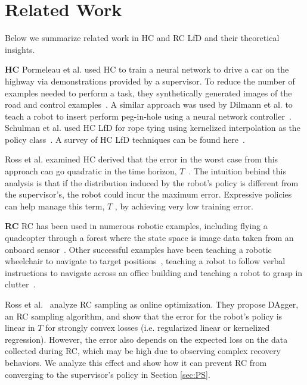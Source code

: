 \documentclass[10pt, conference]{ieeeconf}      %
\newcommand{\ns}{HC }
\newcommand{\nc}{RC }
\begin{document}
\section{Related Work}
Below we summarize related work in HC and RC LfD and their theoretical insights. 

\noindent \textbf {\ns}  Pormeleau et al. used \ns to train a neural network to drive a car on the highway via demonstrations provided by a supervisor. To reduce the number of examples needed to perform a task, they synthetically generated images of the road and control examples~\cite{pomerleau1989alvinn}.  A similar approach was used by Dilmann et al. to teach a robot to insert perform peg-in-hole using a neural network controller~\cite{dillmann1995acquisition}. Schulman et al. used HC LfD for rope tying using kernelized interpolation as the policy class~\cite{schulman2016learning}.  A survey of HC LfD techniques can be found here~\cite{argall2009survey}. 

Ross et al. examined \ns  derived that the error in the worst case from this approach can go quadratic in the time horizon, $T$~\cite{ross2010efficient}. The intuition behind this analysis is that if the distribution induced by the robot's policy is different from the supervisor's, the robot could incur the maximum error. Expressive policies can help manage this term, $T$ , by achieving very low training error. 

\noindent \textbf{\nc}
\nc has been used in numerous robotic examples, including flying a quadcopter through a forest where the state space is image data taken from an onboard sensor~\cite{ross2013learning}. Other successful examples have been teaching a robotic wheelchair to navigate to target positions~\cite{kim2013maximum}, teaching a robot to follow verbal instructions to navigate across an office building \cite{duvallet2013imitation} and teaching a robot to grasp in clutter~\cite{laskeyrobot}.

Ross et al.~\cite{ross2010reduction} analyze RC sampling as online optimization. They propose DAgger, an RC sampling algorithm, and show that the error for the robot's policy is linear in $T$ for strongly convex losses (i.e.  regularized linear or kernelized regression). 
However, the error also depends on the expected loss on the data collected during RC, which may be high due to observing complex recovery behaviors. We analyze this effect and show how it can prevent RC from converging to the supervisor's policy in Section \ref{sec:PS}.
\end{document}
